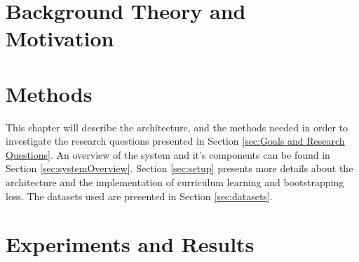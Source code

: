 \documentclass[a4paper]{book}
\begin{document}












\chapter{Background Theory and Motivation}\label{T-B}
\label{cha:TheoryAndBackground}











\chapter{Methods}
\label{cha:architectureAndModel}
This chapter will describe the architecture,  and the methods needed in order to investigate the research questions presented in Section \ref{sec:Goals and Research Questions}. An overview of the system and it's components can be found in Section \ref{sec:systemOverview}. Section \ref{sec:setup} presents more details about the architecture and the implementation of curriculum learning and bootstrapping loss. The datasets used are presented in Section \ref{sec:datasets}.














\chapter{Experiments and Results}
\label{cha:ResearchAndResults}






\end{document}
